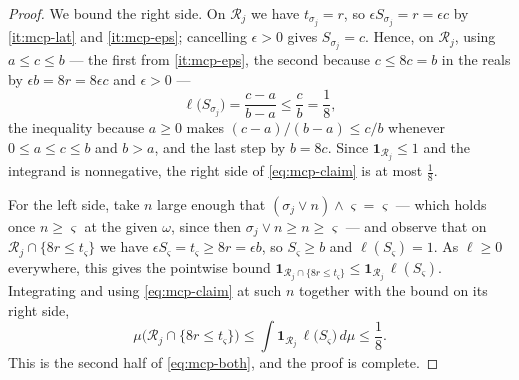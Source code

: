\begin{proof}
We bound the right side. On $\mathcal R_j$ we have $t_{\sigma_j}=r$, so
$\epsilon S_{\sigma_j}=r=\epsilon c$ by \ref{it:mcp-lat} and
\ref{it:mcp-eps}; cancelling $\epsilon>0$ gives $S_{\sigma_j}=c$. Hence, on
$\mathcal R_j$, using $a\le c\le b$ --- the first from \ref{it:mcp-eps}, the
second because $c\le 8c=b$ in the reals by $\epsilon b=8r=8\epsilon c$ and
$\epsilon>0$ ---
\[
  \ell\bigl(S_{\sigma_j}\bigr)=\frac{c-a}{b-a}\le\frac{c}{b}=\frac18 ,
\]
the inequality because $a\ge0$ makes $(c-a)/(b-a)\le c/b$ whenever
$0\le a\le c\le b$ and $b>a$, and the last step by $b=8c$. Since
$\mathbf1_{\mathcal R_j}\le1$ and the integrand is nonnegative, the right side
of \eqref{eq:mcp-claim} is at most $\tfrac18$.

For the left side, take $n$ large enough that
$(\sigma_j\vee n)\wedge\varsigma=\varsigma$ --- which holds once $n\ge\varsigma$
at the given $\omega$, since then $\sigma_j\vee n\ge n\ge\varsigma$ --- and
observe that on $\mathcal R_j\cap\{8r\le t_{\varsigma}\}$ we have
$\epsilon S_\varsigma=t_\varsigma\ge8r=\epsilon b$, so $S_\varsigma\ge b$ and
$\ell(S_\varsigma)=1$. As $\ell\ge0$ everywhere, this gives the pointwise bound
$\mathbf1_{\mathcal R_j\cap\{8r\le t_\varsigma\}}
 \le\mathbf1_{\mathcal R_j}\,\ell(S_\varsigma)$. Integrating and using
\eqref{eq:mcp-claim} at such $n$ together with the bound on its right side,
\[
  \mu\bigl(\mathcal R_j\cap\{8r\le t_{\varsigma}\}\bigr)
   \le\int\mathbf1_{\mathcal R_j}\,\ell\bigl(S_\varsigma\bigr)\,d\mu
   \le\frac18 .
\]
This is the second half of \eqref{eq:mcp-both}, and the proof is complete.
\end{proof}
